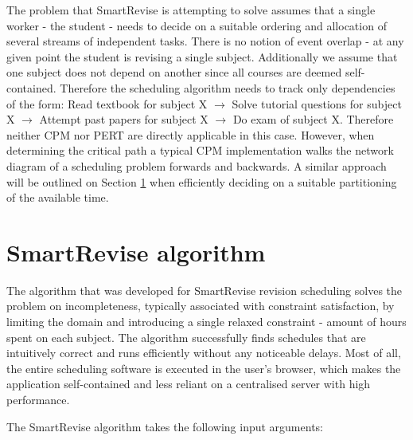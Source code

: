 \documentclass[bsc,frontabs,twoside,singlespacing,parskip]{infthesis}     %
\begin{document}
		The problem that SmartRevise is attempting to solve assumes that a single worker - the student - needs to decide on a suitable ordering and allocation of several streams of independent tasks. There is no notion of event overlap - at any given point the student is revising a single subject. Additionally we assume that one subject does not depend on another since all courses are deemed self-contained. Therefore the scheduling algorithm needs to track only dependencies of the form: Read textbook for subject X $\rightarrow$ Solve tutorial questions for subject X $\rightarrow$ Attempt past papers for subject X $\rightarrow$ Do exam of subject X. Therefore neither CPM nor PERT are directly applicable in this case. However, when determining the critical path a typical CPM implementation walks the network diagram of a scheduling problem forwards and backwards. A similar approach will be outlined on Section \ref{algo} when efficiently deciding on a suitable partitioning of the available time.



	\section{SmartRevise algorithm}\label{algo}

		The algorithm that was developed for SmartRevise revision scheduling solves the problem on incompleteness, typically associated with constraint satisfaction, by limiting the domain and introducing a single relaxed constraint - amount of hours spent on each subject. The algorithm successfully finds schedules that are intuitively correct and runs efficiently without any noticeable delays. Most of all, the entire scheduling software is executed in the user's browser, which makes the application self-contained and less reliant on a centralised server with high performance.

		The SmartRevise algorithm takes the following input arguments:
\end{document}
